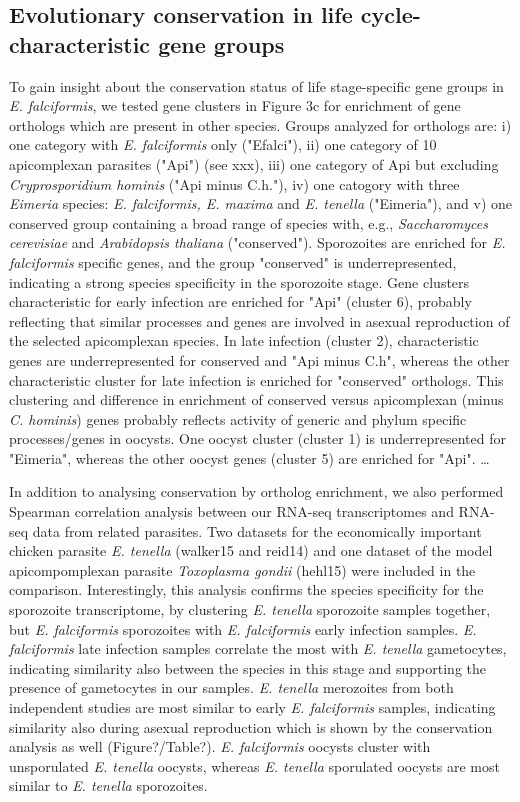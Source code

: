 \documentclass{bmcart}
\begin{document}
\subsection*{Evolutionary conservation in life cycle-characteristic gene groups}
To gain insight about the conservation status of life stage-specific gene groups in 
\textit{E. falciformis}, we tested gene clusters in Figure 3c for enrichment of gene orthologs which 
are present in other species. Groups analyzed for orthologs are: i) one category with \textit{E. falciformis} only ("Efalci"), ii) one category of 10 apicomplexan parasites ("Api") (see xxx), iii) one category of Api but excluding \textit{Cryprosporidium hominis} ("Api minus C.h."), iv) one catogory with three \textit{Eimeria} species: \textit{E. falciformis, E. maxima} and \textit{E. tenella} ("Eimeria"), and v) one conserved group containing a broad range of species with, e.g., \textit{Saccharomyces cerevisiae} and \textit{Arabidopsis thaliana} ("conserved"). 
Sporozoites are enriched for \textit{E. falciformis} specific genes, and the group "conserved" is underrepresented, indicating a strong species specificity in the sporozoite stage. Gene clusters characteristic for early infection are enriched for "Api" (cluster 6), probably reflecting that similar processes and genes are involved in asexual reproduction of the selected apicomplexan species. In late infection (cluster 2), characteristic genes are underrepresented for conserved and "Api minus C.h", whereas the other characteristic cluster for late infection is enriched for "conserved" orthologs. This clustering and difference in enrichment of conserved versus apicomplexan (minus \textit{C. hominis}) genes probably reflects activity of generic and phylum specific processes/genes in oocysts.
One oocyst cluster (cluster 1) is underrepresented for "Eimeria", whereas the other oocyst genes (cluster 5) are enriched for "Api". 
\ldots

In addition to analysing conservation by ortholog enrichment, we also performed Spearman correlation analysis between our RNA-seq transcriptomes and RNA-seq data from related parasites. Two datasets for the economically important chicken parasite \textit{E. tenella} (walker15 and reid14) and one dataset of the model apicompomplexan parasite \textit{Toxoplasma gondii} (hehl15) were included in the comparison. Interestingly, this analysis confirms the species specificity for the sporozoite transcriptome, by clustering \textit{E. tenella} sporozoite samples together, but \textit{E. falciformis} sporozoites with \textit{E. falciformis} early infection samples. \textit{E. falciformis} late infection samples correlate the most with \textit{E. tenella} gametocytes, indicating similarity also between the species in this stage and supporting the presence of gametocytes in our samples. \textit{E. tenella} merozoites from both independent studies are most similar to early \textit{E. falciformis} samples, indicating similarity also during asexual reproduction which is shown by the conservation analysis as well (Figure?/Table?). \textit{E. falciformis} oocysts cluster with unsporulated \textit{E. tenella} oocysts, whereas \textit{E. tenella} sporulated oocysts are most similar to \textit{E. tenella} sporozoites. 
\end{document}
